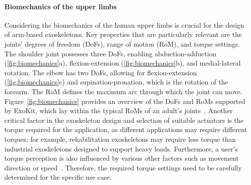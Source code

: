 \paragraph{Biomechanics of the upper limbs}
Considering the biomechanics of the human upper limbs is crucial for the design of arm-based exoskeletons. Key properties that are particularly relevant are the joints’ degrees of freedom (DoFs), range of motion (RoM), and torque settings. 
The shoulder joint possesses three DoFs, enabling abduction-adduction (\autoref{fig:biomechanics}a), flexion-extension (\autoref{fig:biomechanics}b), and medial-lateral rotation. The elbow has two DoFs, allowing for flexion-extension (\autoref{fig:biomechanics}c) and supination-pronation, which is the rotation of the forearm.
The RoM defines the maximum arc through which the joint can move.
Figure~\ref{fig:biomechanics} provides an overview of the DoFs and RoMs supported by ExoKit, which lay within the typical RoMs of an adult's joints~\cite{norkin_2016}.
Another critical factor in the exoskeleton design and selection of suitable actuators is the torque required for the application, as different applications may require different torques; for example, rehabilitation exoskeletons may require less torque than industrial exoskeletons designed to support heavy loads. Furthermore, a user's torque perception is also influenced by various other factors such as movement direction or speed~\cite{kim_2021}. Therefore, the required torque settings need to be carefully determined for the specific use case.

